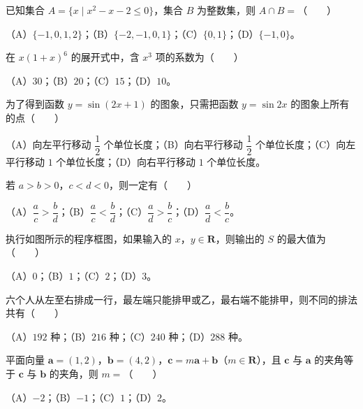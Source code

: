 \begin{question}
已知集合 $A=\{x\mid x^2-x-2\leqslant 0\}$，集合 $B$ 为整数集，则 $A\cap B=$\mbox{（　　）}

（A）$\{-1,0,1,2\}$；（B）$\{-2,-1,0,1\}$；（C）$\{0,1\}$；（D）$\{-1,0\}$。

\end{question}
\begin{question}
在 $x(1+x)^6$ 的展开式中，含 $x^3$ 项的系数为\mbox{（　　）}

（A）$30$；（B）$20$；（C）$15$；（D）$10$。

\end{question}
\begin{question}
为了得到函数 $y=\sin(2x+1)$ 的图象，只需把函数 $y=\sin 2x$ 的图象上所有的点\mbox{（　　）}

（A）向左平行移动 $\dfrac12$ 个单位长度；（B）向右平行移动 $\dfrac12$ 个单位长度；（C）向左平行移动 $1$ 个单位长度；（D）向右平行移动 $1$ 个单位长度。

\end{question}
\begin{question}
若 $a>b>0$，$c<d<0$，则一定有\mbox{（　　）}

（A）$\dfrac ac>\dfrac bd$；（B）$\dfrac ac<\dfrac bd$；（C）$\dfrac ad>\dfrac bc$；（D）$\dfrac ad<\dfrac bc$。

\Needspace{0.4\textheight}
\end{question}
\begin{question}
执行如图所示的程序框图，如果输入的 $x$，$y\in\mathbf R$，则输出的 $S$ 的最大值为\mbox{（　　）}

（A）$0$；（B）$1$；（C）$2$；（D）$3$。
\nopagebreak[4]
\begin{center}\end{center}
\nopagebreak[4]
\end{question}
\begin{question}
六个人从左至右排成一行，最左端只能排甲或乙，最右端不能排甲，则不同的排法共有\mbox{（　　）}

（A）$192$ 种；（B）$216$ 种；（C）$240$ 种；（D）$288$ 种。

\end{question}
\begin{question}
平面向量 $\boldsymbol a=(1,2)$，$\boldsymbol b=(4,2)$，$\boldsymbol c=m\boldsymbol a+\boldsymbol b$（$m\in\mathbf R$），且 $\boldsymbol c$ 与 $\boldsymbol a$ 的夹角等于 $\boldsymbol c$ 与 $\boldsymbol b$ 的夹角，则 $m=$\mbox{（　　）}

（A）$-2$；（B）$-1$；（C）$1$；（D）$2$。

\Needspace{0.4\textheight}
\end{question}
